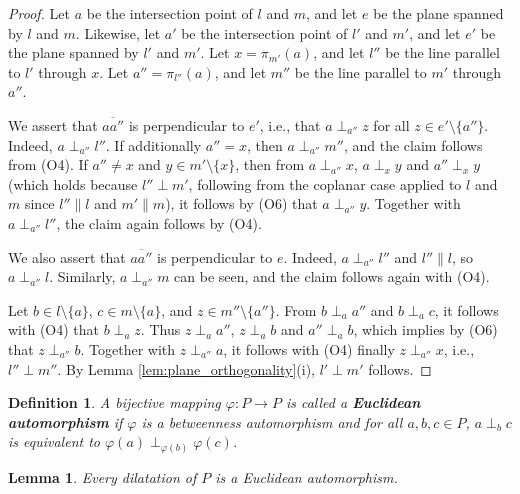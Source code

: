 \documentclass[11pt,a4paper]{article}
\newcommand{\ortho}[3]{#1 \perp_{#2} #3}
\newcommand{\lineab}[1]{\overline{#1}}
\newtheorem{lemma}[theorem]{Lemma}
\newtheorem{definition}[theorem]{Definition}
\begin{document}
\begin{proof}
Let $a$ be the intersection point of $l$ and $m$, and let $e$ be the plane spanned by $l$ and $m$. Likewise, let $a'$ be the intersection point of $l'$ and $m'$, and let $e'$ be the plane spanned by $l'$ and $m'$. Let $x = \pi_{m'}(a)$, and let $l''$ be the line parallel to $l'$ through $x$. Let $a'' = \pi_{l''}(a)$, and let $m''$ be the line parallel to $m'$ through $a''$.

We assert that $\lineab{aa''}$ is perpendicular to $e'$, i.e., that $\ortho{a}{a''}{z}$ for all $z \in e' \setminus \{a''\}$. Indeed, $\ortho{a}{a''}{l''}$. If additionally $a'' = x$, then $\ortho{a}{a''}{m''}$, and the claim follows from (O4). If $a'' \neq x$ and $y \in m' \setminus \{x\}$, then from $\ortho{a}{a''}{x}$, $\ortho{a}{x}{y}$ and $\ortho{a''}{x}{y}$ (which holds because $l'' \perp m'$, following from the coplanar case applied to $l$ and $m$ since $l'' \parallel l$ and $m' \parallel m$), it follows by (O6) that $\ortho{a}{a''}{y}$. Together with $\ortho{a}{a''}{l''}$, the claim again follows by (O4).

We also assert that $\lineab{aa''}$ is perpendicular to $e$. Indeed, $\ortho{a}{a''}{l''}$ and $l'' \parallel l$, so $\ortho{a}{a''}{l}$. Similarly, $\ortho{a}{a''}{m}$ can be seen, and the claim follows again with (O4).

Let $b \in l \setminus \{a\}$, $c \in m \setminus \{a\}$, and $z \in m'' \setminus \{a''\}$. From $\ortho{b}{a}{a''}$ and $\ortho{b}{a}{c}$, it follows with (O4) that $\ortho{b}{a}{z}$. Thus $\ortho{z}{a}{a''}$, $\ortho{z}{a}{b}$ and $\ortho{a''}{a}{b}$, which implies by (O6) that $\ortho{z}{a''}{b}$. Together with $\ortho{z}{a''}{a}$, it follows with (O4) finally $\ortho{z}{a''}{x}$, i.e., $l'' \perp m''$. By Lemma \ref{lem:plane_orthogonality}(i), $l' \perp m'$ follows.
\end{proof}

\begin{definition} \label{def:euclidean_automorphism}
A bijective mapping $\varphi: P \to P$ is called a \textbf{Euclidean automorphism} if $\varphi$ is a betweenness automorphism and for all $a, b, c \in P$, $\ortho{a}{b}{c}$ is equivalent to $\ortho{\varphi(a)}{\varphi(b)}{\varphi(c)}$.
\end{definition}

\begin{lemma} \label{lem:dilatation_euclidean_auto}
Every dilatation of $P$ is a Euclidean automorphism.
\end{lemma}
\end{document}
